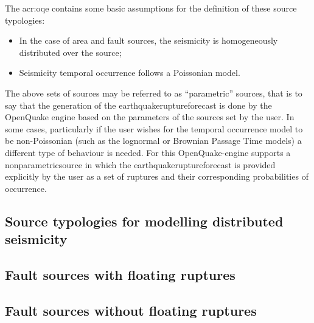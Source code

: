 The \glsdesc{acr:oqe} contains some basic assumptions for the definition of
these source typologies:

\begin{itemize}

    \item In the case of area and fault sources, the seismicity is
    homogeneously distributed over the source;

    \item Seismicity temporal occurrence follows a Poissonian model.

\end{itemize}

The above sets of sources may be referred to as ``parametric'' sources, that is to say that the generation of the \Gls{earthquakeruptureforecast} is done by the OpenQuake engine based on the parameters of the sources set by the user. In some cases, particularly if the user wishes for the temporal occurrence model to be non-Poissonian (such as the lognormal or Brownian Passage Time models) a different type of behaviour is needed. For this OpenQuake-engine supports a \Gls{nonparametricsource} in which the \Gls{earthquakeruptureforecast} is provided explicitly by the user as a set of ruptures and their corresponding probabilities of occurrence.

\subsection{Source typologies for modelling distributed seismicity}


\subsection{Fault sources with floating ruptures}


\subsection{Fault sources without floating ruptures}

